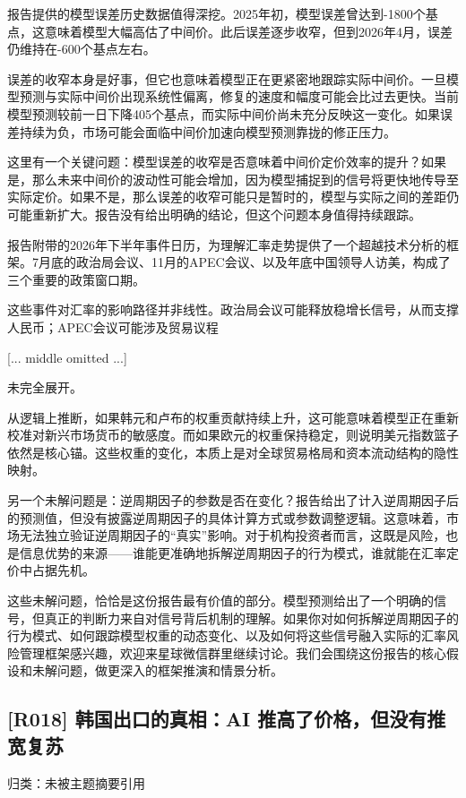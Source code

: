 \documentclass[11pt]{ctexart}
\begin{document}
报告提供的模型误差历史数据值得深挖。2025年初，模型误差曾达到-1800个基点，这意味着模型大幅高估了中间价。此后误差逐步收窄，但到2026年4月，误差仍维持在-600个基点左右。

误差的收窄本身是好事，但它也意味着模型正在更紧密地跟踪实际中间价。一旦模型预测与实际中间价出现系统性偏离，修复的速度和幅度可能会比过去更快。当前模型预测较前一日下降405个基点，而实际中间价尚未充分反映这一变化。如果误差持续为负，市场可能会面临中间价加速向模型预测靠拢的修正压力。

这里有一个关键问题：模型误差的收窄是否意味着中间价定价效率的提升？如果是，那么未来中间价的波动性可能会增加，因为模型捕捉到的信号将更快地传导至实际定价。如果不是，那么误差的收窄可能只是暂时的，模型与实际之间的差距仍可能重新扩大。报告没有给出明确的结论，但这个问题本身值得持续跟踪。

报告附带的2026年下半年事件日历，为理解汇率走势提供了一个超越技术分析的框架。7月底的政治局会议、11月的APEC会议、以及年底中国领导人访美，构成了三个重要的政策窗口期。

这些事件对汇率的影响路径并非线性。政治局会议可能释放稳增长信号，从而支撑人民币；APEC会议可能涉及贸易议程

[... middle omitted ...]

未完全展开。

从逻辑上推断，如果韩元和卢布的权重贡献持续上升，这可能意味着模型正在重新校准对新兴市场货币的敏感度。而如果欧元的权重保持稳定，则说明美元指数篮子依然是核心锚。这些权重的变化，本质上是对全球贸易格局和资本流动结构的隐性映射。

另一个未解问题是：逆周期因子的参数是否在变化？报告给出了计入逆周期因子后的预测值，但没有披露逆周期因子的具体计算方式或参数调整逻辑。这意味着，市场无法独立验证逆周期因子的“真实”影响。对于机构投资者而言，这既是风险，也是信息优势的来源——谁能更准确地拆解逆周期因子的行为模式，谁就能在汇率定价中占据先机。

这些未解问题，恰恰是这份报告最有价值的部分。模型预测给出了一个明确的信号，但真正的判断力来自对信号背后机制的理解。如果你对如何拆解逆周期因子的行为模式、如何跟踪模型权重的动态变化、以及如何将这些信号融入实际的汇率风险管理框架感兴趣，欢迎来星球微信群里继续讨论。我们会围绕这份报告的核心假设和未解问题，做更深入的框架推演和情景分析。

\subsection{[R018] 韩国出口的真相：AI 推高了价格，但没有推宽复苏}
{\small\color{refgray}归类：未被主题摘要引用}
\end{document}
